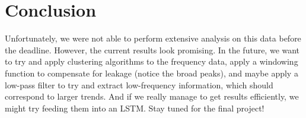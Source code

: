 \documentclass[final]{article}
\begin{document}













\section{Conclusion}

Unfortunately, we were not able to perform extensive analysis on this
data before the deadline. However, the current results look promising.
In the future, we want to try and apply clustering algorithms to the
frequency data, apply a windowing function to compensate for leakage
(notice the broad peaks), and maybe apply a low-pass filter to try and
extract low-frequency information, which should correspond to larger
trends. And if we really manage to get results efficiently, we might
try feeding them into an LSTM. Stay tuned for the final project!

\end{document}
